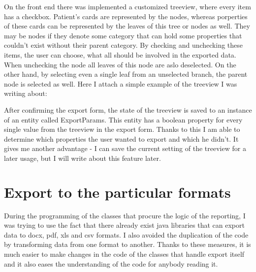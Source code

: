 \documentclass[thesis=B,english]{FITthesis}[2012/10/20]
\begin{document}
On the front end there was implemented a customized treeview, where every item has a checkbox. Patient's cards are represented by the nodes, whereas porperties of these cards can be represented by the leaves of this tree or nodes as well. They may be nodes if they denote some category that can hold some properties that couldn't exist without their parent category. By checking and unchecking these items, the user can choose, what all should be involved in the exported data. When unchecking the node all leaves of this node are aslo deselected. On the other hand, by selecting even a single leaf from an unselected branch, the parent node is selected as well.
Here I attach a simple example of the treeview I was writing about:


\begin{figure}[ht]
\end{figure}

After confirming the export form, the state of the treeview is saved to an instance of an entity called ExportParams. This entity has a boolean property for every single value from the treeview in the export form. Thanks to this I am able to determine which properties the user wanted to export and which he didn't. It gives me another advantage - I can save the current setting of the treeview for a later usage, but I will write about this feature later.

\section{Export to the particular formats}
During the  programming of the classes that procure the logic of the reporting, I was trying to use the fact that there already exist java libraries that can export data to docx, pdf, xls and csv formats. I also avoided the duplication of the code by transforming data from one format to another. Thanks to these measures, it is much easier to make changes in the code of the classes that handle export itself and it also eases the understanding of the code for anybody reading it.
\end{document}
